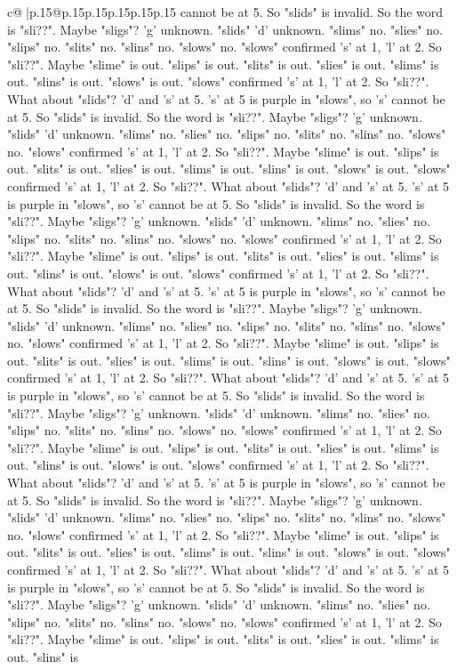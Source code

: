 \documentclass{article}
\begin{document}
{\begin{supertabular}{c@{$\;$}|p{.15\linewidth}@{}p{.15\linewidth}p{.15\linewidth}p{.15\linewidth}p{.15\linewidth}p{.15\linewidth}}
{{{cannot be at 5. So "slids" is invalid. So the word is "sli??". Maybe "sligs"? 'g' unknown. "slids" 'd' unknown. "slims" no. "slies" no. "slips" no. "slits" no. "slins" no. "slows" no. "slows" confirmed 's' at 1, 'l' at 2. So "sli??". Maybe "slime" is out. "slips" is out. "slits" is out. "slies" is out. "slims" is out. "slins" is out. "slows" is out. "slows" confirmed 's' at 1, 'l' at 2. So "sli??". What about "slids"? 'd' and 's' at 5. 's' at 5 is purple in "slows", so 's' cannot be at 5. So "slids" is invalid. So the word is "sli??". Maybe "sligs"? 'g' unknown. "slids" 'd' unknown. "slims" no. "slies" no. "slips" no. "slits" no. "slins" no. "slows" no. "slows" confirmed 's' at 1, 'l' at 2. So "sli??". Maybe "slime" is out. "slips" is out. "slits" is out. "slies" is out. "slims" is out. "slins" is out. "slows" is out. "slows" confirmed 's' at 1, 'l' at 2. So "sli??". What about "slids"? 'd' and 's' at 5. 's' at 5 is purple in "slows", so 's' cannot be at 5. So "slids" is invalid. So the word is "sli??". Maybe "sligs"? 'g' unknown. "slids" 'd' unknown. "slims" no. "slies" no. "slips" no. "slits" no. "slins" no. "slows" no. "slows" confirmed 's' at 1, 'l' at 2. So "sli??". Maybe "slime" is out. "slips" is out. "slits" is out. "slies" is out. "slims" is out. "slins" is out. "slows" is out. "slows" confirmed 's' at 1, 'l' at 2. So "sli??". What about "slids"? 'd' and 's' at 5. 's' at 5 is purple in "slows", so 's' cannot be at 5. So "slids" is invalid. So the word is "sli??". Maybe "sligs"? 'g' unknown. "slids" 'd' unknown. "slims" no. "slies" no. "slips" no. "slits" no. "slins" no. "slows" no. "slows" confirmed 's' at 1, 'l' at 2. So "sli??". Maybe "slime" is out. "slips" is out. "slits" is out. "slies" is out. "slims" is out. "slins" is out. "slows" is out. "slows" confirmed 's' at 1, 'l' at 2. So "sli??". What about "slids"? 'd' and 's' at 5. 's' at 5 is purple in "slows", so 's' cannot be at 5. So "slids" is invalid. So the word is "sli??". Maybe "sligs"? 'g' unknown. "slids" 'd' unknown. "slims" no. "slies" no. "slips" no. "slits" no. "slins" no. "slows" no. "slows" confirmed 's' at 1, 'l' at 2. So "sli??". Maybe "slime" is out. "slips" is out. "slits" is out. "slies" is out. "slims" is out. "slins" is out. "slows" is out. "slows" confirmed 's' at 1, 'l' at 2. So "sli??". What about "slids"? 'd' and 's' at 5. 's' at 5 is purple in "slows", so 's' cannot be at 5. So "slids" is invalid. So the word is "sli??". Maybe "sligs"? 'g' unknown. "slids" 'd' unknown. "slims" no. "slies" no. "slips" no. "slits" no. "slins" no. "slows" no. "slows" confirmed 's' at 1, 'l' at 2. So "sli??". Maybe "slime" is out. "slips" is out. "slits" is out. "slies" is out. "slims" is out. "slins" is out. "slows" is out. "slows" confirmed 's' at 1, 'l' at 2. So "sli??". What about "slids"? 'd' and 's' at 5. 's' at 5 is purple in "slows", so 's' cannot be at 5. So "slids" is invalid. So the word is "sli??". Maybe "sligs"? 'g' unknown. "slids" 'd' unknown. "slims" no. "slies" no. "slips" no. "slits" no. "slins" no. "slows" no. "slows" confirmed 's' at 1, 'l' at 2. So "sli??". Maybe "slime" is out. "slips" is out. "slits" is out. "slies" is out. "slims" is out. "slins" is }}}
\end{supertabular}}
\end{document}
